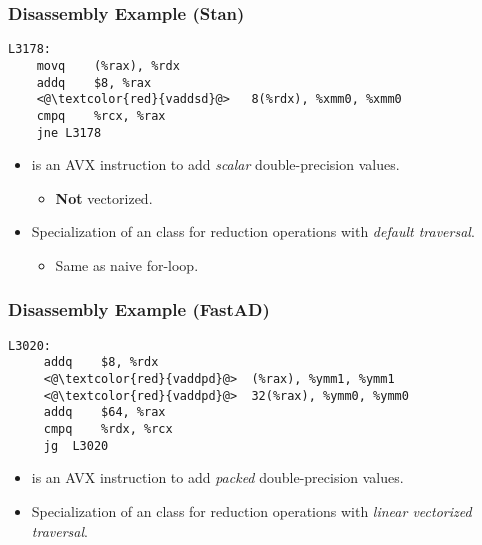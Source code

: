 \begin{frame}[fragile]
\frametitle{Disassembly Example (Stan)}

\begin{lstlisting}[style=customasm]
L3178:
    movq    (%rax), %rdx
    addq    $8, %rax
    <@\textcolor{red}{vaddsd}@>   8(%rdx), %xmm0, %xmm0 
    cmpq    %rcx, %rax 
    jne L3178
\end{lstlisting}

\begin{itemize}
\item {} is an AVX instruction to add \emph{scalar} double-precision values.
    \begin{itemize}
        \item \textbf{Not} vectorized.
    \end{itemize}

\item Specialization of an  class 
    for reduction operations with \emph{default traversal}.
    \begin{itemize}
        \item Same as naive for-loop.
    \end{itemize}

\end{itemize}
\end{frame}

\begin{frame}[fragile]
\frametitle{Disassembly Example (FastAD)}

\begin{lstlisting}[style=customasm]
 L3020:
     addq    $8, %rdx
     <@\textcolor{red}{vaddpd}@>  (%rax), %ymm1, %ymm1   
     <@\textcolor{red}{vaddpd}@>  32(%rax), %ymm0, %ymm0 
     addq    $64, %rax
     cmpq    %rdx, %rcx 
     jg  L3020 
\end{lstlisting}

\begin{itemize}

\item {} is an AVX instruction to add \emph{packed} double-precision values.

\item Specialization of an  class 
    for reduction operations with \emph{linear vectorized traversal}.

\end{itemize}
\end{frame}

